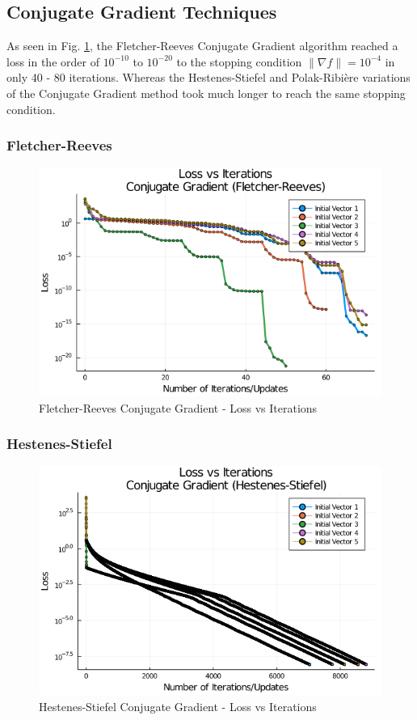 \documentclass{article}
\begin{document}
    \subsection{Conjugate Gradient Techniques}

    As seen in Fig. \ref{fig:ConjugateGradientFletcherReeves_LossPlot.png}, 
    the Fletcher-Reeves Conjugate Gradient algorithm reached a loss in the order of $10^{-10}$ to $10^{-20}$ to the stopping condition $\| \nabla f \| = 10^{-4}$ in only 40 - 80 iterations. Whereas the Hestenes-Stiefel and Polak-Ribi\`ere variations of the Conjugate Gradient method took much longer to reach the same stopping condition.

    \subsubsection{Fletcher-Reeves}
    \begin{figure}[H]
        \centering
        \includegraphics[width=0.5\linewidth]{./ConjugateGradientFletcherReeves_LossPlot.png}
        \caption{Fletcher-Reeves Conjugate Gradient - Loss vs Iterations}
        \label{fig:ConjugateGradientFletcherReeves_LossPlot.png}
    \end{figure}
    
    \subsubsection{Hestenes-Stiefel}
    \begin{figure}[H]
        \centering
        \includegraphics[width=0.5\linewidth]{./ConjugateGradientHestenesStiefel_LossPlot.png}
        \caption{Hestenes-Stiefel Conjugate Gradient - Loss vs Iterations}
        \label{fig:ConjugateGradientHestenesStiefel_LossPlot.png}
    \end{figure}
    
\end{document}
